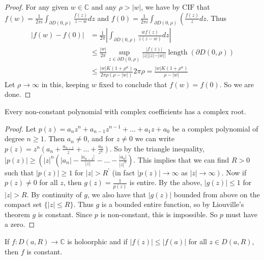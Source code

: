 \documentclass[egregdoesnotlikesansseriftitles,a4paper]{scrartcl}
\begin{document}
\begin{proof}
     For any given $w \in \mathbb{C}$ and any $\rho>|w|$, we have by $\mathrm{CIF}$ that $f(w)=\frac{1}{2 \pi i} \int_{\partial D(0, \rho)} \frac{f(z)}{z-w} d z$ and $f(0)=\frac{1}{2 \pi i} \int_{\partial D(0, \rho)}\left(\frac{f(z)}{z} d z\right.$. Thus
     $$
     \begin{aligned}
     |f(w)-f(0)| &=\frac{1}{2 \pi}\left|\int_{\partial D(0, \rho)} \frac{w f(z)}{z(z-w)} d z\right| \\
     & \leq \frac{|w|}{2 \pi} \sup _{z \in \partial D(0, \rho)} \frac{|f(z)|}{|z||| z|-| w||} \operatorname{length}(\partial D(0, \rho)) \\
     & \leq \frac{|w| K\left(1+\rho^{\alpha}\right)}{2 \pi \rho(\rho-|w|)} 2 \pi \rho=\frac{|w| K\left(1+\rho^{\alpha}\right)}{\rho-|w|}
     \end{aligned}
     $$
     Let $\rho \rightarrow \infty$ in this, keeping $w$ fixed to conclude that $f(w)=f(0)$. So we are done.
\end{proof}
\begin{theorem}
      Every non-constant polynomial with complex coefficients has a complex root.
\end{theorem}
\begin{proof}
     Let $p(z)=a_{n} z^{n}+a_{n-1} z^{n-1}+\ldots+a_{1} z+a_{0}$ be a complex polynomial of degree $n \geq 1$. Then $a_{n} \neq 0$, and for $z \neq 0$ we can write $p(z)=z^{n}\left(a_{n}+\frac{a_{n-1}}{z}+\ldots+\frac{a_{0}}{z^{n}}\right)$. So by the triangle inequality,
     $|p(z)| \geq\left(|z|^{n}\left(\left|a_{n}\right|-\frac{\left|a_{n-1}\right|}{|z|}-\ldots-\frac{\left|a_{0}\right|}{|z|^{n}}\right)\right.$. This implies that we can find
     $R>0$ such that $|p(z)| \geq 1$ for $|z|>R^{\prime}$ (in fact $|p(z)| \rightarrow \infty$ as $\left.|z| \rightarrow \infty\right)$.
     Now if $p(z) \neq 0$ for all $z$, then $g(z)=\frac{1}{p(z)}$ is entire. By the above, $|g(z)| \leq 1$ for $|z|>R$. By continuity of $g$, we also have that $|g(z)|$ bounded from above on the compact set $\{|z| \leq R\}$. Thus $g$ is a bounded entire function, so by Liouville's theorem $g$ is constant. Since $p$ is non-constant, this is impossible. So $p$ must have a zero.
\end{proof}
\begin{theorem}
      If $f: D \left(a,R\right)\rightarrow \mathbb{C}$ is holoorphic and if $\left|f \left(z\right)\right|\leq \left|f \left(a\right)\right| $ for all $z \in D \left(a,R\right)$, then $f$ is constant.
\end{theorem}
\end{document}
